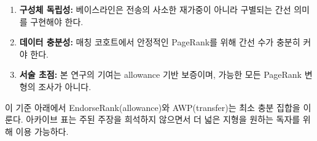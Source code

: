 \begin{enumerate}
\item \textbf{구성체 독립성:} 베이스라인은 전송의 사소한 재가중이 아니라 구별되는 간선 의미를 구현해야 한다.
\item \textbf{데이터 충분성:} 매칭 코호트에서 안정적인 PageRank를 위해 간선 수가 충분히 커야 한다.
\item \textbf{서술 초점:} 본 연구의 기여는 allowance 기반 보증이며, 가능한 모든 PageRank 변형의 조사가 아니다.
\end{enumerate}

이 기준 아래에서 EndorseRank(allowance)와 AWP(transfer)는 최소 충분 집합을 이룬다. 아카이브 표는 주된 주장을 희석하지 않으면서 더 넓은 지형을 원하는 독자를 위해 이용 가능하다.
